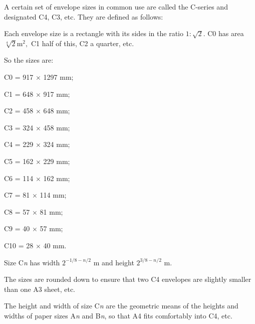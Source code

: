 A certain set of envelope sizes in common use are called the C-series and designated C4, C3, etc. They are defined as follows:
\par
Each envelope size is a rectangle with its sides in the ratio $ 1 : \sqrt{2} . $ C0 has area $ \sqrt[4]{2} \mathrm{m}^2 ,$ C1 half of this, C2 a quarter, etc.
\par
So the sizes are:
\par
C0 = 917 \ensuremath{ \times } 1297 mm;
\par
C1 = 648 \ensuremath{ \times } 917 mm; 
\par
C2 = 458 \ensuremath{ \times } 648 mm;
\par
C3 = 324 \ensuremath{ \times } 458 mm;
\par
C4 = 229 \ensuremath{ \times } 324 mm;
\par
C5 = 162 \ensuremath{ \times } 229 mm;
\par
C6 = 114 \ensuremath{ \times } 162 mm;
\par
C7 = 81 \ensuremath{ \times } 114 mm;
\par
C8 = 57 \ensuremath{ \times } 81 mm;
\par
C9 = 40 \ensuremath{ \times } 57 mm;
\par
C10 = 28 \ensuremath{ \times } 40 mm.
\par
Size C\emph{n} has width $2^{-1/8-n/2}$ m and height $2^{3/8-n/2}$ m.
\par
The sizes are rounded down to ensure that two C4 envelopes are slightly smaller than one A3 sheet, etc. 
\par
The height and width of size C\emph{n} are the geometric means of the heights and widths of paper sizes A\emph{n} and B\emph{n}, so that A4 fits comfortably into C4, etc.
  